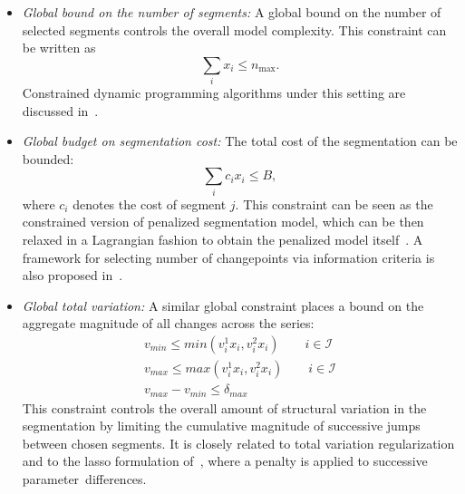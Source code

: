 \documentclass[mathematics,article,accept,pdftex,moreauthors]{Definitions/mdpi}
\begin{document}
\begin{itemize}
	\item {\it Global bound on the number of segments:}
	A global bound on the number of selected segments controls the overall model complexity. This constraint can be written as
\begin{equation}
		\sum_i x_i \le n_{\max}.
	\end{equation}
	Constrained dynamic programming algorithms under this setting are discussed in~\cite{hocking2017constrained}.
	
	\item {\it Global budget on segmentation cost:}
	The total cost of the segmentation can be bounded:
\begin{equation}
		\sum_{i} c_i x_i \le B,
	\end{equation}
	where $c_i$ denotes the cost of segment $j$. This constraint can be seen as the constrained version of penalized segmentation model, which can be then relaxed in a Lagrangian fashion to obtain the penalized model itself~\cite{KFE12}. 
	A framework for selecting number of changepoints via information criteria is also proposed in~\cite{Y88}.
	
	\item {\it Global total variation:}
	A similar global constraint places a bound on the aggregate magnitude of all changes across the series:
\begin{equation}
		\begin{split}
			v_{min} \leq min(v^1_i x_i,v^2_i x_i) \qquad i \in \mathcal{I} \\ 
			v_{max} \leq max(v^1_i x_i,v^2_i x_i) \qquad i \in \mathcal{I} \\ 
			v_{max} - v_{min} \leq \delta_{max}
		\end{split}
	\end{equation}
	This constraint controls the overall amount of structural variation in the segmentation by limiting the cumulative magnitude of successive jumps between chosen segments. It is closely related to total variation regularization and to the lasso formulation of~\cite{tibshirani2005sparsity}, where a penalty is applied to successive parameter~differences. 


\end{itemize}
\end{document}
